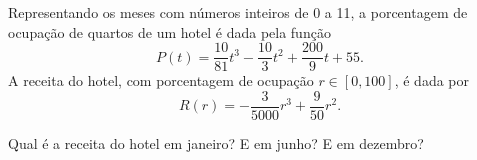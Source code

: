Representando os meses com números inteiros de 0 a 11, a porcentagem de ocupação de quartos de um hotel é
dada pela função
\[
	P(t)=\frac{10}{81}t^3-\frac{10}{3}t^2+\frac{200}{9}t+55.
\]
A receita do hotel, com porcentagem de ocupação $r\in[0,100]$, é dada por
\[
	R(r)=-\frac{3}{5000}r^3+\frac{9}{50}r^2.
\]

Qual é a receita do hotel em janeiro? E em junho? E em dezembro?

